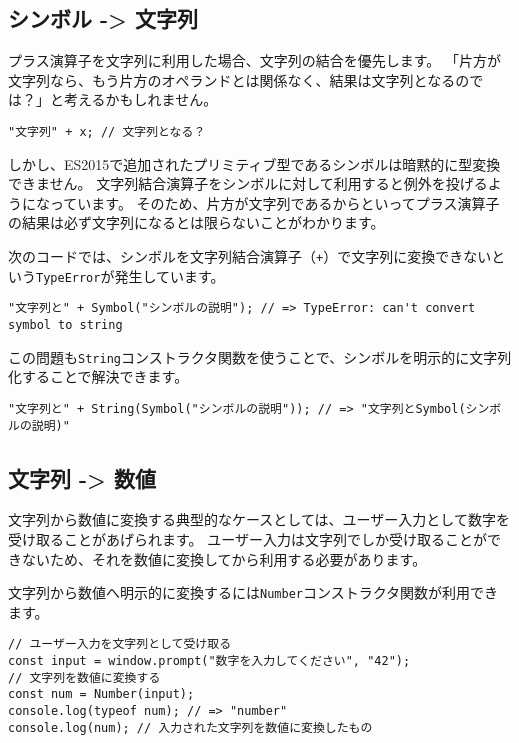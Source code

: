 \hypertarget{symbol-to-string}{%
\subsection{シンボル -\textgreater{} 文字列}\label{symbol-to-string}}

プラス演算子を文字列に利用した場合、文字列の結合を優先します。
「片方が文字列なら、もう片方のオペランドとは関係なく、結果は文字列となるのでは？」と考えるかもしれません。

\begin{lstlisting}
"文字列" + x; // 文字列となる？
\end{lstlisting}

しかし、ES2015で追加されたプリミティブ型であるシンボルは暗黙的に型変換できません。
文字列結合演算子をシンボルに対して利用すると例外を投げるようになっています。
そのため、片方が文字列であるからといってプラス演算子の結果は必ず文字列になるとは限らないことがわかります。

次のコードでは、シンボルを文字列結合演算子（\texttt{+}）で文字列に変換できないという\texttt{TypeError}が発生しています。

\begin{lstlisting}
"文字列と" + Symbol("シンボルの説明"); // => TypeError: can't convert symbol to string
\end{lstlisting}

この問題も\texttt{String}コンストラクタ関数を使うことで、シンボルを明示的に文字列化することで解決できます。

\begin{lstlisting}
"文字列と" + String(Symbol("シンボルの説明")); // => "文字列とSymbol(シンボルの説明)"
\end{lstlisting}

\hypertarget{string-to-number}{%
\subsection{文字列 -\textgreater{} 数値}\label{string-to-number}}

文字列から数値に変換する典型的なケースとしては、ユーザー入力として数字を受け取ることがあげられます。
ユーザー入力は文字列でしか受け取ることができないため、それを数値に変換してから利用する必要があります。

文字列から数値へ明示的に変換するには\texttt{Number}コンストラクタ関数が利用できます。

\begin{lstlisting}
// ユーザー入力を文字列として受け取る
const input = window.prompt("数字を入力してください", "42");
// 文字列を数値に変換する
const num = Number(input);
console.log(typeof num); // => "number"
console.log(num); // 入力された文字列を数値に変換したもの
\end{lstlisting}

